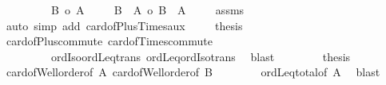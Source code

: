 \begin{isabellebody}
\ \ \isacommand{{\isacharbraceright}{\kern0pt}}\isamarkupfalse%
\isanewline
\ \ \isamarkupfalse%
\isanewline
\ \ \isacommand{{\isacharbraceleft}{\kern0pt}}\isamarkupfalse%
\isamarkupfalse%
\ {\isachardoublequoteopen}{\isacharbar}{\kern0pt}B{\isacharbar}{\kern0pt}\ {\isasymle}o\ {\isacharbar}{\kern0pt}A{\isacharbar}{\kern0pt}{\isachardoublequoteclose}\isanewline
\ \ \ \isamarkupfalse%
\ {\isachardoublequoteopen}{\isacharbar}{\kern0pt}B\ {\isacharless}{\kern0pt}{\isacharplus}{\kern0pt}{\isachargreater}{\kern0pt}\ A{\isacharbar}{\kern0pt}\ {\isasymle}o\ {\isacharbar}{\kern0pt}B\ {\isasymtimes}\ A{\isacharbar}{\kern0pt}{\isachardoublequoteclose}\isanewline
\ \ \ \isamarkupfalse%
\ assms\ \isamarkupfalse%
\ {\isacharparenleft}{\kern0pt}auto\ simp\ add{\isacharcolon}{\kern0pt}\ card{\isacharunderscore}{\kern0pt}of{\isacharunderscore}{\kern0pt}Plus{\isacharunderscore}{\kern0pt}Times{\isacharunderscore}{\kern0pt}aux{\isacharparenright}{\kern0pt}\isanewline
\ \ \ \isamarkupfalse%
\ {\isacharquery}{\kern0pt}thesis\isanewline
\ \ \ \isamarkupfalse%
\ card{\isacharunderscore}{\kern0pt}of{\isacharunderscore}{\kern0pt}Plus{\isacharunderscore}{\kern0pt}commute\ card{\isacharunderscore}{\kern0pt}of{\isacharunderscore}{\kern0pt}Times{\isacharunderscore}{\kern0pt}commute\isanewline
\ \ \ \ \ \ \ \ \ ordIso{\isacharunderscore}{\kern0pt}ordLeq{\isacharunderscore}{\kern0pt}trans\ ordLeq{\isacharunderscore}{\kern0pt}ordIso{\isacharunderscore}{\kern0pt}trans\ \isamarkupfalse%
\ blast\isanewline
\ \ \isacommand{{\isacharbraceright}{\kern0pt}}\isamarkupfalse%
\isanewline
\ \ \isamarkupfalse%
\ \isamarkupfalse%
\ {\isacharquery}{\kern0pt}thesis\isanewline
\ \ \isamarkupfalse%
\ card{\isacharunderscore}{\kern0pt}of{\isacharunderscore}{\kern0pt}Well{\isacharunderscore}{\kern0pt}order{\isacharbrackleft}{\kern0pt}of\ A{\isacharbrackright}{\kern0pt}\ card{\isacharunderscore}{\kern0pt}of{\isacharunderscore}{\kern0pt}Well{\isacharunderscore}{\kern0pt}order{\isacharbrackleft}{\kern0pt}of\ B{\isacharbrackright}{\kern0pt}\isanewline
\ \ \ \ \ \ \ \ ordLeq{\isacharunderscore}{\kern0pt}total{\isacharbrackleft}{\kern0pt}of\ {\isachardoublequoteopen}{\isacharbar}{\kern0pt}A{\isacharbar}{\kern0pt}{\isachardoublequoteclose}{\isacharbrackright}{\kern0pt}\ \isamarkupfalse%
\ blast\isanewline
{}\isamarkupfalse%
%
\endisatagproof
{\isafoldproof}%
%
\isadelimproof
\isanewline

\end{isabellebody}
